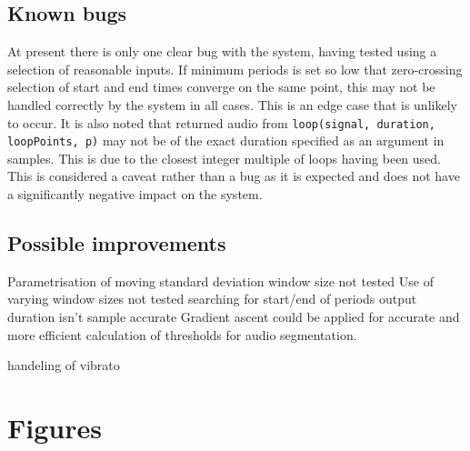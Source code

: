 \documentclass[titlepage]{scrartcl}
\begin{document}
\subsection{Known bugs}
At present there is only one clear bug with the system, having tested using a
selection of reasonable inputs. If minimum periods is set so low that
zero-crossing selection of start and end times converge on the same point, this
may not be handled correctly by the system in all cases. This is an edge case
that is unlikely to occur.
It is also noted that returned audio from \texttt{loop(signal, duration,
loopPoints, p)} may not be of the exact duration specified as an argument in
samples. This is due to the closest integer multiple of loops having been used.
This is considered a caveat rather than a bug as it is expected and does not
have a significantly negative impact on the system.

\subsection{Possible improvements}
Parametrisation of moving standard deviation window size not tested
Use of varying window sizes not tested
searching for start/end of periods
output duration isn't sample accurate
Gradient ascent could be applied for accurate and more efficient calculation
of thresholds for audio segmentation.

handeling of vibrato

\section{Figures}

\printbibliography
\end{document}
